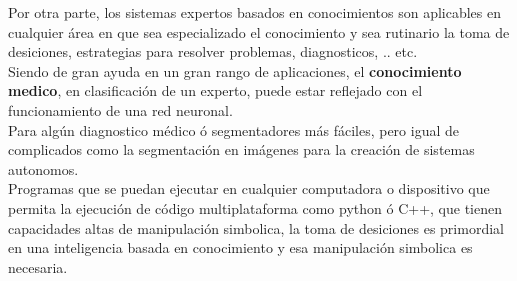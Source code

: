 \documentclass[a4paper, 11pt]{article}
\begin{document}
Por otra parte, los sistemas expertos basados en conocimientos son aplicables en cualquier  área en que sea especializado el conocimiento y sea rutinario la toma de desiciones, estrategias para resolver problemas, diagnosticos, .. etc.\\
Siendo de gran ayuda en un gran rango de aplicaciones, el \textbf{conocimiento medico}, en clasificación de un experto, puede estar reflejado con el funcionamiento de una red neuronal.\\

Para algún diagnostico médico ó segmentadores más fáciles, pero igual de complicados como la segmentación en imágenes para la creación de sistemas autonomos.\\

Programas que se puedan ejecutar en cualquier computadora o dispositivo que permita la ejecución de código multiplataforma como python ó C++, que tienen capacidades altas de manipulación simbolica, la toma de desiciones es primordial en una inteligencia basada en conocimiento y esa manipulación simbolica es necesaria.








\end{document}

